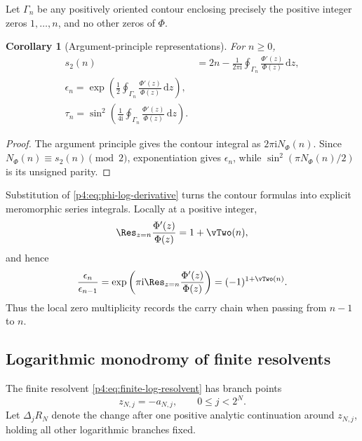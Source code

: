 \documentclass[11pt,oneside]{article}
\newtheorem{corollary}[theorem]{Corollary}
\theoremstyle{definition}
\newcommand{\dd}{\,\mathrm d}
\newcommand{\ii}{\mathrm i}
\begin{document}
Let \(\Gamma_n\) be any positively oriented contour enclosing precisely the positive integer
zeros \(1,\ldots,n\), and no other zeros of \(\Phi\).

\begin{corollary}[Argument-principle representations]
\label{p4:cor:argument-TM}
For \(n\ge0\),
\begin{align}
 s_2(n)
 &=2n-\frac{1}{2\pi\ii}\oint_{\Gamma_n}\frac{\Phi'(z)}{\Phi(z)}\dd z,
 \label{p4:eq:digit-contour}\\
 \boxed{\displaystyle
 \epsilon_n=\exp\left(\frac12\oint_{\Gamma_n}
 \frac{\Phi'(z)}{\Phi(z)}\dd z\right),}
 \label{p4:eq:epsilon-contour}\\
 \boxed{\displaystyle
 \tau_n=\sin^2\left(\frac{1}{4\ii}\oint_{\Gamma_n}
 \frac{\Phi'(z)}{\Phi(z)}\dd z\right).}
 \label{p4:eq:tau-contour}
\end{align}
\end{corollary}

\begin{proof}
The argument principle gives the contour integral as \(2\pi\ii N_\Phi(n)\). Since
\(N_\Phi(n)\equiv s_2(n)\pmod2\), exponentiation gives \(\epsilon_n\), while
\(\sin^2(\pi N_\Phi(n)/2)\) is its unsigned parity.
\end{proof}

Substitution of \eqref{p4:eq:phi-log-derivative} turns the contour formulas into explicit
meromorphic series integrals. Locally at a positive integer,
\begin{equation}
 \Res_{z=n}\frac{\Phi'(z)}{\Phi(z)}=1+\vTwo(n),
 \label{p4:eq:local-residue}
\end{equation}
and hence
\begin{equation}
 \frac{\epsilon_n}{\epsilon_{n-1}}
 =\exp\left(\pi\ii\Res_{z=n}\frac{\Phi'(z)}{\Phi(z)}\right)
 =(-1)^{1+\vTwo(n)}.
 \label{p4:eq:local-TM-ratio}
\end{equation}
Thus the local zero multiplicity records the carry chain when passing from \(n-1\) to \(n\).

\subsection{Logarithmic monodromy of finite resolvents}

The finite resolvent \eqref{p4:eq:finite-log-resolvent} has branch points
\begin{equation}
 z_{N,j}=-a_{N,j},\qquad 0\le j<2^N.
 \label{p4:eq:branch-points}
\end{equation}
Let \(\Delta_jR_N\) denote the change after one positive analytic continuation around
\(z_{N,j}\), holding all other logarithmic branches fixed.
\end{document}
